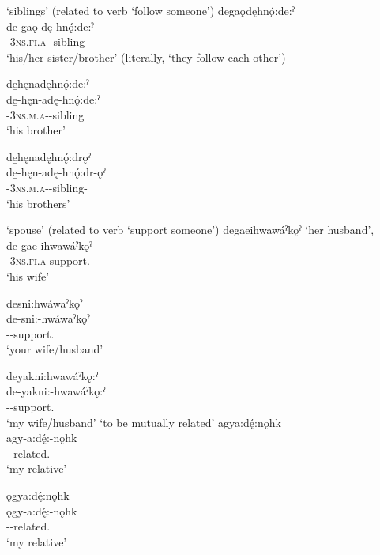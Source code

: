 \ea\label{ex:kintermppex}
 ‘siblings’ (related to verb  ‘follow someone’)
\ea degaǫdęhnǫ́:de:ˀ\\
\gll de-gaǫ-dę-hnǫ́:de:ˀ\\
 {\dualic}-\textsc{3ns.fi.a}-{\semireflexive}-sibling\\
\glt `his/her sister/brother' (literally, ‘they follow each other’)

\ex de̱hęnadęhnǫ́:de:ˀ\\
\gll de̱-hęn-adę-hnǫ́:de:ˀ\\
 {\dualic}-\textsc{3ns.m.a}-{\semireflexive}-sibling\\
\glt `his brother'

\ex de̱hęnadęhnǫ́:drǫˀ\\
\gll de̱-hęn-adę-hnǫ́:dr-ǫˀ\\
 {\dualic}-\textsc{3ns.m.a}-{\semireflexive}-sibling-{\distributive}\\
\glt `his brothers'
\z
\z

\ea\label{ex:kintermppex2}  ‘spouse’ (related to verb  ‘support someone’)
\ea degaeihwawáˀkǫˀ ‘her husband’,\\
\gll de-gae-ihwawáˀkǫˀ\\
 {\dualic}-\textsc{3ns.fi.a}-support.{\distributive}\\
\glt `his wife'

\ex desni:hwáwaˀkǫˀ\\
\gll de-sni:-hwáwaˀkǫˀ\\
 {\dualic}--support.{\distributive}\\
\glt `your wife/husband'

\ex deyakni:hwawáˀkǫ:ˀ\\
\gll de-yakni:-hwawáˀkǫ:ˀ\\
 {\dualic}--support.{\distributive}\\
\glt `my wife/husband'
\z
\z
\newpage
\ea\label{ex:samegeninlawex4}  ‘to be mutually related’
\ea agya:dę́:nǫhk\\
\gll agy-a:dę́:-nǫhk\\
 -{\semireflexive}-related.{\stative}\\
\glt `my relative'

\ex ǫgya:dę́:nǫhk\\
\gll ǫgy-a:dę́:-nǫhk\\
 -{\semireflexive}-related.{\stative}\\
\glt `my relative'


